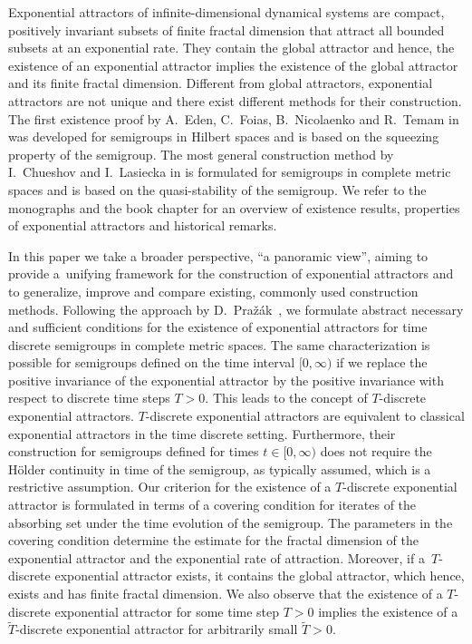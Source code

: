\documentclass[a4paper,12pt,reqno]{amsart}
\theoremstyle{plain}
\theoremstyle{definition}
\numberwithin{equation}{section}
\begin{document}
Exponential attractors of infinite-dimensional dynamical systems are compact, positively invariant subsets of finite fractal dimension that attract all bounded subsets at an exponential rate. 
They contain the global attractor and hence, the existence of an exponential attractor implies the existence  of the global attractor and its finite fractal dimension. Different from global attractors, exponential attractors are not unique and there exist different methods for their construction. The first existence proof by A.~Eden, C.~Foias, B.~Nicolaenko and R.~Temam in \cite{EFNT94} was developed for semigroups in Hilbert spaces and is based on the squeezing property of the semigroup. The most general construction method by I.~Chueshov and I.~Lasiecka in \cite{cl2008} is formulated for semigroups in complete metric spaces and is based on the quasi-stability of the semigroup. We refer to the monographs \cite{EFNT94, chueshov} and the book chapter \cite{MiZe} for an overview of existence results, properties of exponential attractors and historical remarks.

In this paper we take a broader perspective, ``a panoramic view'', aiming to provide a~unifying framework for the construction of exponential attractors and to generalize, improve and compare existing, commonly used construction methods. Following the approach by D.~Pra\v{z}\'ak~\cite{Pra03b}, we formulate abstract necessary and sufficient conditions for the existence of exponential attractors for time discrete semigroups in complete metric spaces. The same characterization is possible for semigroups defined on the time interval $[0,\infty)$ if we replace the positive invariance of the exponential attractor by the positive invariance with respect to discrete time steps $T>0$. This leads to the concept of  $T$-discrete exponential attractors.   $T$-discrete exponential attractors are equivalent to classical exponential attractors in the time discrete setting. Furthermore, their construction for semigroups defined for times $t\in[0,\infty)$ does not require the H\"older continuity in time of the semigroup, as typically assumed,  which is a restrictive assumption. Our criterion for the existence of a $T$-discrete exponential attractor is formulated in terms of a covering condition for iterates of the absorbing set under the time evolution of the semigroup. The parameters in the covering condition determine the estimate for the fractal dimension of the exponential attractor and the exponential rate of attraction. Moreover, if a~$T$-discrete exponential attractor
exists, it contains the global attractor, which hence, exists and has finite fractal dimension. We also observe that the existence of a $T$-discrete exponential attractor for some time step $T>0$ implies the existence of a $\widetilde T$-discrete exponential attractor for arbitrarily small $\widetilde T>0$. 
\end{document}
